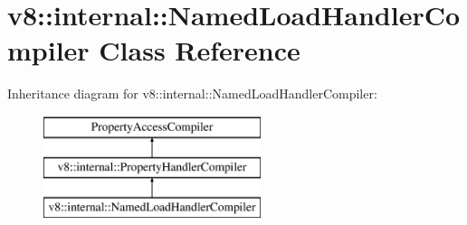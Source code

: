 \hypertarget{classv8_1_1internal_1_1_named_load_handler_compiler}{}\section{v8\+:\+:internal\+:\+:Named\+Load\+Handler\+Compiler Class Reference}
\label{classv8_1_1internal_1_1_named_load_handler_compiler}
Inheritance diagram for v8\+:\+:internal\+:\+:Named\+Load\+Handler\+Compiler\+:\begin{figure}[H]
\begin{center}
\leavevmode
\includegraphics[height=3.000000cm]{classv8_1_1internal_1_1_named_load_handler_compiler}
\end{center}
\end{figure}
